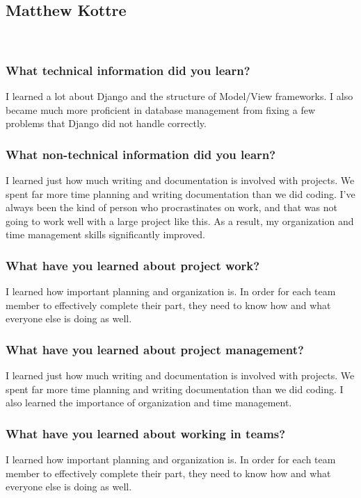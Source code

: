 \subsection{Matthew Kottre}\\
\subsubsection{What technical information did you learn?}
\noindent I learned a lot about Django and the structure of Model/View frameworks. I also became much more proficient in database management from fixing a few problems that Django did not handle correctly.\\

\subsubsection{What non-technical information did you learn?}
\noindent I learned just how much writing and documentation is involved with projects. We spent far more time planning and writing documentation than we did coding. I've always been the kind of person who procrastinates on work, and that was not going to work well with a large project like this. As a result, my organization and time management skills significantly improved.\\ 

\subsubsection{What have you learned about project work?}
\noindent I learned how important planning and organization is. In order for each team member to effectively complete their part, they need to know how and what everyone else is doing as well.\\ 

\subsubsection{What have you learned about project management?}
\noindent I learned just how much writing and documentation is involved with projects. We spent far more time planning and writing documentation than we did coding. I also learned the importance of organization and time management.\\

\subsubsection{What have you learned about working in teams?}
\noindent I learned how important planning and organization is. In order for each team member to effectively complete their part, they need to know how and what everyone else is doing as well.\\

